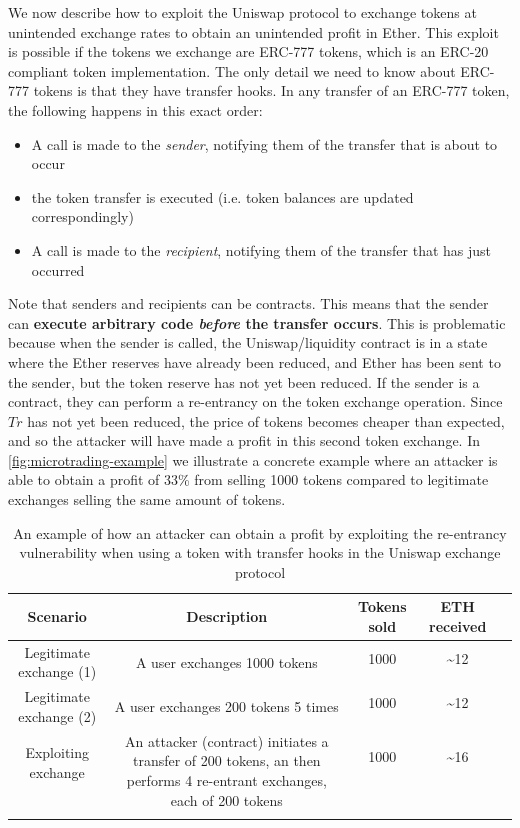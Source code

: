\documentclass[twoside,11pt,openright]{report}
\begin{document}
We now describe how to exploit the Uniswap protocol to exchange tokens at unintended exchange rates to obtain an unintended profit in Ether. This exploit is possible if the tokens we exchange are ERC-777 tokens, which is an ERC-20 compliant token implementation. The only detail we need to know about ERC-777 tokens is that they have transfer hooks. In any transfer of an ERC-777 token, the following happens in this exact order:
\begin{itemize}
    \item A call is made to the \textit{sender}, notifying them of the transfer that is about to occur
    \item the token transfer is executed (i.e. token balances are updated correspondingly)
    \item A call is made to  the \textit{recipient}, notifying them of the transfer that has just occurred 
\end{itemize}
Note that senders and recipients can be contracts. This means that the sender can \textbf{execute arbitrary code \textit{before} the transfer occurs}. This is problematic because when the sender is called, the Uniswap/liquidity contract is in a state where the Ether reserves have already been reduced, and Ether has been sent to the sender, but the token reserve has not yet been reduced. If the sender is a contract, they can perform a re-entrancy on the token exchange operation. Since $Tr$ has not yet been reduced, the price of tokens becomes cheaper than expected, and so the attacker will have made a profit in this second token exchange. In \autoref{fig:microtrading-example} we illustrate a concrete example where an attacker is able to obtain a profit of 33\% from selling 1000 tokens compared to legitimate exchanges selling the same amount of tokens.
\begin{table}[h]
\centering
\begin{tabular}{ |c|c|c|c|c| } 
\hline
Scenario & Description & Tokens sold & ETH received \\
\hline
\multirow{2}{6em}{Legitimate exchange (1)} & \multirow{2}{10em}{A user exchanges 1000 tokens}&1000& \textasciitilde 12 \\
&&&\\
\hline
\multirow{2}{6em}{Legitimate exchange (2)} & \multirow{2}{10em}{A user exchanges 200 tokens 5 times} &1000& \textasciitilde 12 \\
&&&\\
\hline
\multirow{2}{6em}{Exploiting exchange}  & \multirow{4}{10em}{An attacker (contract) initiates a transfer of 200 tokens, an then performs 4 re-entrant exchanges, each of 200 tokens} &  1000 & \textasciitilde 16 \\
&&&\\
&&&\\
&&&\\
&&&\\
\hline
\end{tabular}
\caption{An example of how an attacker can obtain a profit by exploiting the re-entrancy vulnerability when using a token with transfer hooks in the Uniswap exchange protocol}
\label{fig:microtrading-example}
\end{table}
\end{document}
